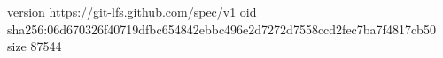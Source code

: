 version https://git-lfs.github.com/spec/v1
oid sha256:06d670326f40719dfbc654842ebbc496e2d7272d7558ccd2fec7ba7f4817cb50
size 87544
